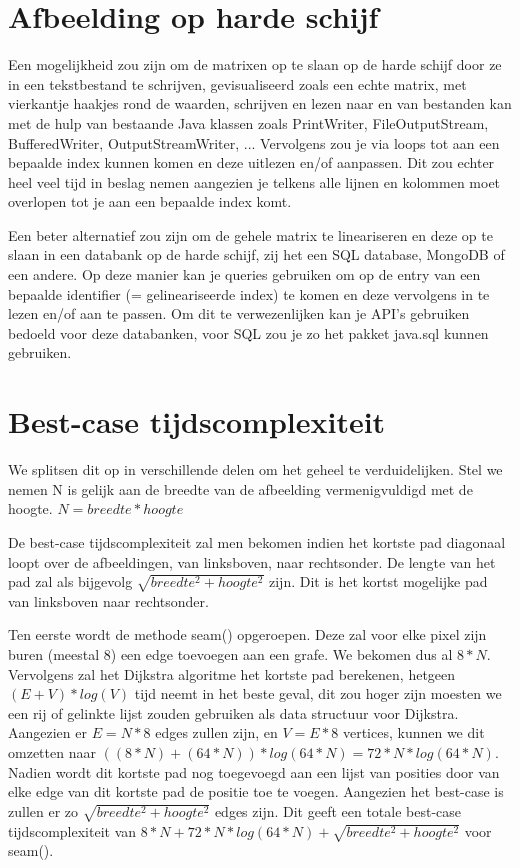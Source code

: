 \documentclass{article}
\begin{document}
\section{Afbeelding op harde schijf}

Een mogelijkheid zou zijn om de matrixen op te slaan op de harde schijf door ze in een tekstbestand te schrijven, gevisualiseerd zoals een echte matrix, met vierkantje haakjes rond de waarden, schrijven en lezen naar en van bestanden kan met de hulp van bestaande Java klassen zoals PrintWriter, FileOutputStream, BufferedWriter, OutputStreamWriter, ... Vervolgens zou je via loops tot aan een bepaalde index kunnen komen en deze uitlezen en/of aanpassen. Dit zou echter heel veel tijd in beslag nemen aangezien je telkens alle lijnen en kolommen moet overlopen tot je aan een bepaalde index komt.

Een beter alternatief zou zijn om de gehele matrix te lineariseren en deze op te slaan in een databank op de harde schijf, zij het een SQL database, MongoDB of een andere. Op deze manier kan je queries gebruiken om op de entry van een bepaalde identifier (= gelineariseerde index) te komen en deze vervolgens in te lezen en/of aan te passen. Om dit te verwezenlijken kan je API's gebruiken bedoeld voor deze databanken, voor SQL zou je zo het pakket java.sql\cite{javasql} kunnen gebruiken.

\section{Best-case tijdscomplexiteit}

We splitsen dit op in verschillende delen om het geheel te verduidelijken.
Stel we nemen N is gelijk aan de breedte van de afbeelding vermenigvuldigd met de hoogte. $ N = breedte * hoogte $

De best-case tijdscomplexiteit zal men bekomen indien het kortste pad diagonaal loopt over de afbeeldingen, van linksboven, naar rechtsonder. De lengte van het pad zal als bijgevolg $ \sqrt{breedte^2 + hoogte^2} $ zijn. Dit is het kortst mogelijke pad van linksboven naar rechtsonder.

Ten eerste wordt de methode seam() opgeroepen. Deze zal voor elke pixel zijn buren (meestal 8) een edge toevoegen aan een grafe. We bekomen dus al $ 8 * N $. Vervolgens zal het Dijkstra algoritme het kortste pad berekenen, hetgeen $ (E + V) * log (V) $ tijd neemt in het beste geval, dit zou hoger zijn moesten we een rij of gelinkte lijst zouden gebruiken als data structuur voor Dijkstra. Aangezien er $ E = N * 8 $ edges zullen zijn, en $ V = E * 8 $ vertices, kunnen we dit omzetten naar $ ((8 * N) + (64 * N)) * log (64 * N) = 72 * N * log ( 64 * N) $. Nadien wordt dit kortste pad nog toegevoegd aan een lijst van posities door van elke edge van dit kortste pad de positie toe te voegen. Aangezien het best-case is zullen er zo $ \sqrt{breedte^2 + hoogte^2} $ edges zijn. Dit geeft een totale best-case tijdscomplexiteit van $ 8 * N + 72 * N * log ( 64 * N) + \sqrt{breedte^2 + hoogte^2} $ voor seam().
\end{document}
